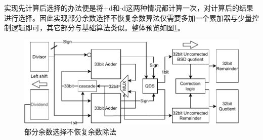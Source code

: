 \documentclass[UTF8,12pt,punct=kaiming,fontset=none]{ctexart}
\begin{document}
实现先计算后选择的办法便是将+d和-d这两种情况都计算一次，对计算后的结果进行选择。因此实现部分余数选择不恢复余数算法仅需要多加一个累加器与少量控制逻辑即可，其它部分与基础算法类似。整体预览如图\ref{fig6}。
\begin{figure}[h]
    \centering
    \includegraphics[scale=1]{div.pdf}
    \caption{部分余数选择不恢复余数除法}
    \label{fig6}
\end{figure}
\end{document}
